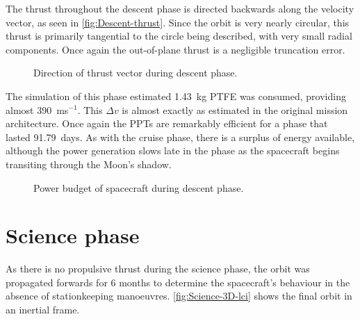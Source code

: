 The thrust throughout the descent phase is directed backwards along the velocity vector, as seen in \autoref{fig:Descent-thrust}. Since the orbit is very nearly circular, this thrust is primarily tangential to the circle being described, with very small radial components. Once again the out-of-plane thrust is a negligible truncation error.

\begin{figure}
\centering
\def\svgwidth{\figurewidth}

\caption{Direction of thrust vector during descent phase.} \label{fig:Descent-thrust}
\end{figure}

The simulation of this phase estimated 1.43~kg PTFE was consumed, providing almost 390~ms$^{-1}$. This $\Delta v$ is almost exactly as estimated in the original mission architecture. Once again the PPTs are remarkably efficient for a phase that lasted 91.79~days. As with the cruise phase, there is a surplus of energy available, although the power generation slows late in the phase as the spacecraft begins transiting through the Moon's shadow.

\begin{figure}
\centering
\def\svgwidth{\figurewidth}

\caption{Power budget of spacecraft during descent phase.} \label{fig:Descent-power}
\end{figure}


\clearpage


\section{Science phase} \label{sec:Science}

As there is no propulsive thrust during the science phase, the orbit was propagated forwards for 6 months to determine the spacecraft's behaviour in the absence of stationkeeping manoeuvres. \autoref{fig:Science-3D-lci} shows the final orbit in an inertial frame. %

